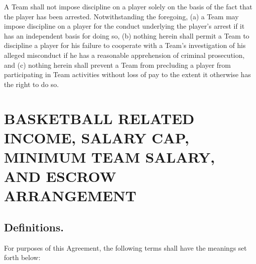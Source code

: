 \documentclass[
]{book}
\begin{document}
A Team shall not impose discipline on a player solely on the basis of the fact that the player has been arrested. Notwithstanding the foregoing, (a) a Team may impose discipline on a player for the conduct underlying the player's arrest if it has an independent basis for doing so, (b) nothing herein shall permit a Team to discipline a player for his failure to cooperate with a Team's investigation of his alleged misconduct if he has a reasonable apprehension of criminal prosecution, and (c) nothing herein shall prevent a Team from precluding a player from participating in Team activities without loss of pay to the extent it otherwise has the right to do so.

\hypertarget{basketball-related-income-salary-cap-minimum-team-salary-and-escrow-arrangement}{%
\chapter{BASKETBALL RELATED INCOME, SALARY CAP, MINIMUM TEAM SALARY, AND ESCROW ARRANGEMENT}\label{basketball-related-income-salary-cap-minimum-team-salary-and-escrow-arrangement}}


\hypertarget{definitions.-1}{%
\section{Definitions.}\label{definitions.-1}}

For purposes of this Agreement, the following terms shall have the meanings set forth below:
\end{document}

